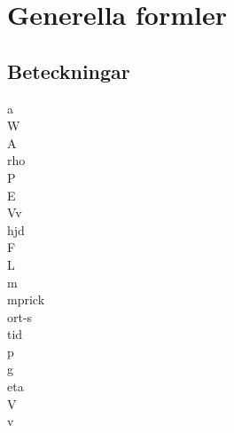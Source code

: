 \chapter{Generella formler}
\section*{Beteckningar}

\acrfull{a}\\
\acrfull{W}\\
\acrfull{A}\\
\acrfull{rho}\\
\acrfull{P}\\
\acrfull{E}\\
\acrfull{Vv}\\
\acrfull{hjd}\\
\acrfull{F}\\
\acrfull{L}\\
\acrfull{m}\\
\acrfull{mprick}\\
\acrfull{ort-s}\\
\acrfull{tid}\\
\acrfull{p}\\
\acrfull{g}\\
\acrfull{eta}\\
\acrfull{V}\\
\acrfull{v}


